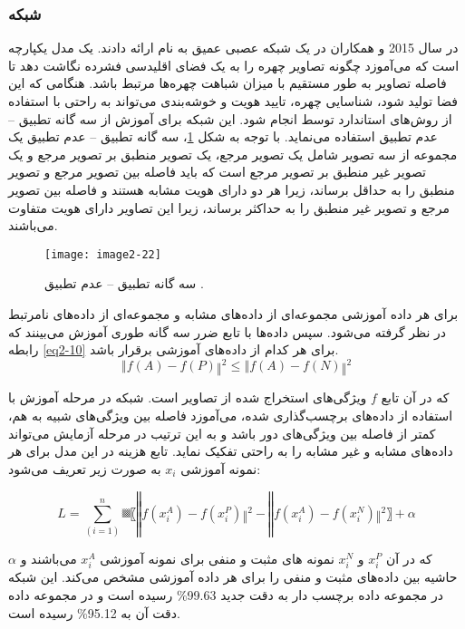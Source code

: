 \subsubsection{	شبکه }
در سال 2015  و همکاران در \cite{7298682} یک شبکه عصبی عمیق به نام  ارائه دادند.  یک مدل یکپارچه است که می‌آموزد چگونه تصاویر چهره را به یک فضای اقلیدسی فشرده نگاشت دهد تا فاصله تصاویر به طور مستقیم با میزان شباهت چهره‌ها مرتبط باشد. هنگامی که این فضا تولید شود، شناسایی چهره، تایید هویت و خوشه‌بندی می‌تواند به راحتی با استفاده از روش‌های استاندارد توسط  انجام شود. این شبکه برای آموزش از سه گانه تطبیق – عدم تطبیق استفاده می‌نماید. با توجه به شکل \ref{image2-22}، سه گانه تطبیق – عدم تطبیق یک مجموعه از سه تصویر شامل یک تصویر مرجع، یک تصویر منطبق بر تصویر مرجع و یک تصویر غیر منطبق بر تصویر مرجع است که باید فاصله بین تصویر مرجع و تصویر منطبق را به حداقل برساند، زیرا هر دو دارای هویت مشابه هستند و فاصله بین تصویر مرجع و تصویر غیر منطبق را به حداکثر برساند، زیرا این تصاویر دارای هویت متفاوت می‌باشند. 
 
\begin{figure}[h]
\centering
  \texttt{[image: image2-22]}
  \caption{سه گانه تطبیق – عدم تطبیق \cite{7298682}.}
  \label{image2-22}
\end{figure}

\noindent 
برای هر داده آموزشی  مجموعه‌ای از داده‌های مشابه  و مجموعه‌ای از داده‌های نامرتبط  در نظر گرفته می‌شود. سپس داده‌ها با تابع ضرر سه گانه طوری آموزش می‌بینند که رابطه \ref{eq2-10} برای هر کدام از داده‌های آموزشی برقرار باشد.
\begin{equation}
\label{eq2-10}
‖f(A)-f(P)‖^2≤‖f(A)-f(N)‖^2	
\end{equation}

\noindent
که در آن تابع $f$ ویژگی‌های استخراج شده از تصاویر است. شبكه در مرحله آموزش با استفاده از داده‌های برچسب‌گذاری شده، می‌آموزد فاصله بین ویژگی‌های شبیه به هم، کمتر از فاصله بین ویژگی‌های دور باشد و به این ترتیب در مرحله آزمایش می‌تواند داده‌های مشابه و غیر مشابه را به راحتی تفكیک نماید. تابع هزینه در این مدل برای هر نمونه آموزشی $x_i$ به صورت زیر تعریف می‌شود:

\begin{equation}\label{eq2-11}
L=∑_(i=1)^n▒〖‖f(x_i^A )-f(x_i^P)‖^2-‖f(x_i^A )-f(x_i^N)‖^2 〗+ \alpha
\end{equation}

\noindent
که در آن $x_i^P$ و $x_i^N$ نمونه های مثبت و منفی برای نمونه آموزشی $x_i^A$ می‌باشند و $\alpha$ حاشیه بین داده‌های مثبت و منفی را برای هر داده آموزشی مشخص می‌کند. این شبکه در مجموعه داده برچسب دار  به دقت جدید 99.63\% رسیده است و در مجموعه داده  دقت آن به 95.12\% رسیده است.

